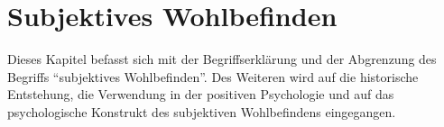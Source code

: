 %
%
\chapter{Subjektives Wohlbefinden}\label{chap.swb}
\glsresetall
Dieses Kapitel befasst sich mit der Begriffserklärung und der Abgrenzung des Begriffs \textquotedblleft subjektives Wohlbefinden\textquotedblright. Des Weiteren wird auf die historische Entstehung, die Verwendung in der positiven Psychologie und auf das psychologische Konstrukt des subjektiven Wohlbefindens eingegangen.
